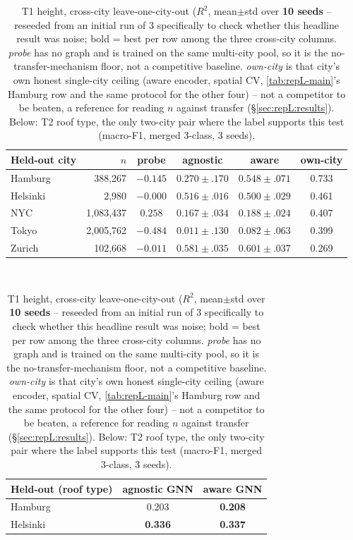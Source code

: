 \begin{table}[t]
  \centering
  \caption{T1 height, cross-city leave-one-city-out ($R^2$, mean$\pm$std over
  \textbf{10 seeds} -- reseeded from an initial run of 3 specifically to check
  whether this headline result was noise; bold = best per row among the three
  cross-city columns. \emph{probe} has no graph and is trained on the same
  multi-city pool, so it is the no-transfer-mechanism floor, not a competitive
  baseline. \emph{own-city} is that city's own honest single-city ceiling
  (aware encoder, spatial CV, \cref{tab:repL-main}'s Hamburg row and the same
  protocol for the other four) -- not a competitor to be beaten, a reference
  for reading $n$ against transfer (\S\ref{sec:repL:results}). Below: T2 roof
  type, the only two-city pair where the label supports this test (macro-F1,
  merged 3-class, 3 seeds).}
  \label{tab:repL-crosscity}
  \small\setlength{\tabcolsep}{4pt}
  \begin{tabular}{@{}lrcccc@{}}
    \toprule
    Held-out city & $n$ & probe & agnostic & aware & own-city\\
    \midrule
    Hamburg  & 388{,}267   & $-0.145$ & $0.270\pm.170$ & $\mathbf{0.548\pm.071}$ & 0.733\\
    Helsinki & 2{,}980     & $-0.000$ & $\mathbf{0.516\pm.016}$ & $0.500\pm.029$ & 0.461\\
    NYC      & 1{,}083{,}437 & $\mathbf{0.258}$ & $0.167\pm.034$ & $0.188\pm.024$ & 0.407\\
    Tokyo    & 2{,}005{,}762 & $-0.484$ & $0.011\pm.130$ & $\mathbf{0.082\pm.063}$ & 0.399\\
    Zurich   & 102{,}668   & $-0.011$ & $0.581\pm.035$ & $\mathbf{0.601\pm.037}$ & 0.269\\
    \bottomrule
  \end{tabular}\\[4pt]
  \begin{tabular}{@{}lcc@{}}
    \toprule
    Held-out (roof type) & agnostic GNN & aware GNN\\
    \midrule
    Hamburg  & 0.203 & \textbf{0.208}\\
    Helsinki & \textbf{0.336} & \textbf{0.337}\\
    \bottomrule
  \end{tabular}
\end{table}


